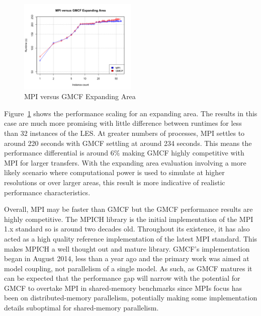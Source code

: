 \begin{figure}
    \includegraphics[width=0.5\textwidth]{graphs/GMCF-MPI-expanding-area.png}
    \caption{MPI versus GMCF Expanding Area}
    \label{fig:gmcfmpiexpandingarea}
\end{figure}

Figure~\ref{fig:gmcfmpiexpandingarea} shows the performance scaling for an
expanding area. The results in this case are much more promising with little
difference between runtimes for less than 32 instances of the LES. At greater
numbers of processes, MPI settles to around 220 seconds with GMCF settling at
around 234 seconds. This means the performance differential is around 6\% making
GMCF highly competitive with MPI for larger transfers. With the expanding area
evaluation involving a more likely scenario where computational power is used to
simulate at higher resolutions or over larger areas, this result is more
indicative of realistic performance characteristics.

Overall, MPI may be faster than GMCF but the GMCF performance results are highly
competitive. The MPICH library is the initial implementation of the MPI 1.x
standard so is around two decades old. Throughout its existence, it has also
acted as a high quality reference implementation of the latest MPI standard.
This makes MPICH a well thought out and mature library. GMCF's implementation
began in August 2014, less than a year ago and the primary work was aimed at
model coupling, not parallelism of a single model. As such, as GMCF matures it
can be expected that the performance gap will narrow with the potential for GMCF
to overtake MPI in shared-memory benchmarks since MPIs focus has been on
distributed-memory parallelism, potentially making some implementation details
suboptimal for shared-memory parallelism.
